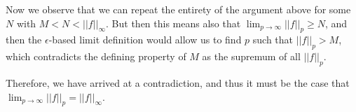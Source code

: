 \begin{solution}
    Now we observe that we can repeat the entirety of the argument above for some $N$ with $M < N < \lvert \lvert f \rvert \rvert _{\infty}$.
    But then this means also that $\lim_{p \rightarrow \infty} \lvert \lvert f \rvert \rvert _p \geq N$, and then the $\epsilon$-based limit definition would allow us to find $p$ such that $\lvert \lvert f \rvert \rvert _p > M$, which contradicts the defining property of $M$ as the supremum of all $\lvert \lvert f \rvert \rvert _p$.

    Therefore, we have arrived at a contradiction, and thus it must be the case that $\lim_{p \rightarrow \infty} \lvert \lvert f \rvert \rvert _p = \lvert \lvert f \rvert \rvert _{\infty}$.

\end{solution}